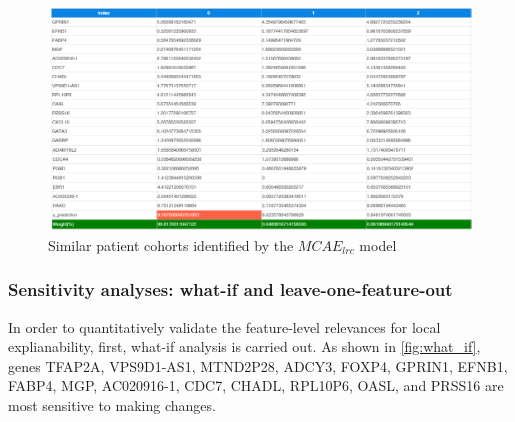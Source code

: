 \begin{figure}[h]
    \centering
	\includegraphics[scale=0.65]{images/similar_profiles.png}
	\caption{Similar patient cohorts identified by the $MCAE_{lrc}$ model}
    \label{fig:similar_patients}
\end{figure}


\subsubsection{Sensitivity analyses: what-if and leave-one-feature-out}
In order to quantitatively validate the feature-level relevances for local explianability, first, what-if analysis is carried out. As shown in \cref{fig:what_if}, genes TFAP2A, VPS9D1-AS1, MTND2P28, ADCY3, FOXP4, GPRIN1, EFNB1, FABP4, MGP, AC020916-1, CDC7, CHADL, RPL10P6, OASL, and PRSS16 are most sensitive to making changes. 

